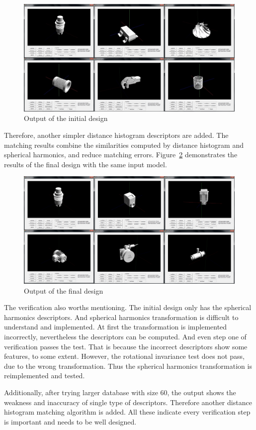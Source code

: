 \begin{figure}[h]
\centering
\includegraphics[width=0.7\linewidth]{output_initialdesign}
\caption{Output of the initial design} \label{output_initialdesign}
\end{figure}

Therefore, another simpler distance histogram  descriptors are added. The matching results combine the similarities computed by distance histogram and spherical harmonics, and reduce matching errors. Figure~\ref{output_finaldesign} demonstrates the results of the final design with the same input model. 
\begin{figure}[h]
\centering
\includegraphics[width=0.7\linewidth]{output_finaldesign}
\caption{Output of the final design} \label{output_finaldesign}
\end{figure}

The verification also worths mentioning. The initial design only has the spherical harmonics descriptors. And spherical harmonics transformation is difficult to understand and implemented. At first the transformation is implemented incorrectly, nevertheless the descriptors can be computed. And even step one of verification passes the test. That is because the incorrect descriptors show some features, to some extent. However, the rotational invariance test does not pass, due to the wrong transformation. Thus the spherical harmonics transformation is reimplemented and tested. 

Additionally, after trying larger database with size 60, the output shows the weakness and inaccuracy of single type of descriptors. Therefore another distance histogram matching algorithm is added. All these indicate every verification step is important and needs to be well designed.